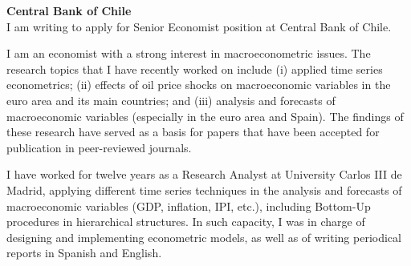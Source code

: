 \documentclass{letter}\usepackage[]{graphicx}\usepackage[]{color}
\begin{document}
\vspace{40}
\textbf{Central Bank of Chile}\\





I am writing to apply for Senior Economist position at Central Bank of Chile.

I am an economist with a strong interest in macroeconometric issues. The research topics that I have recently worked on include (i) applied time series econometrics; (ii) effects of oil price shocks on macroeconomic variables in the euro area and its main countries; and (iii) analysis and forecasts of macroeconomic variables (especially in the euro area and Spain). The findings of these research have served as a basis for papers that have been accepted for publication in peer-reviewed journals.

I have worked for twelve years as a Research Analyst at University Carlos III de Madrid, applying different time series techniques in the analysis and forecasts of macroeconomic variables (GDP, inflation, IPI, etc.), including Bottom-Up procedures in hierarchical structures. In such capacity, I was in charge of designing and implementing econometric models, as well as of writing periodical reports in Spanish and English. 
\end{document}
